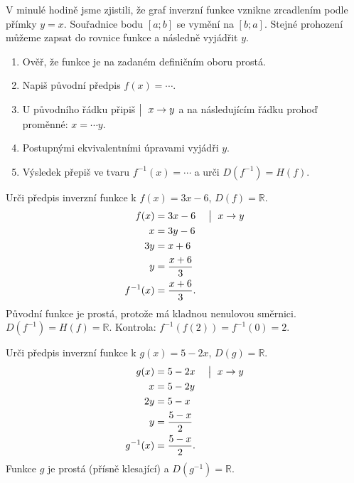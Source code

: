\documentclass[11pt,a4paper]{article}
\begin{document}

V minulé hodině jsme zjistili, že graf inverzní funkce vznikne zrcadlením podle přímky $y=x$. Souřadnice bodu $[a;b]$ se vymění na $[b;a]$. Stejné prohození můžeme zapsat do rovnice funkce a následně vyjádřit $y$.

\begin{enumerate}[label=\arabic*.]
\item Ověř, že funkce je na zadaném definičním oboru prostá.
\item Napiš původní předpis $f(x)=\cdots$.
\item U původního řádku připiš $\bigm|\ x\to y$ a na následujícím řádku prohoď proměnné: $x=\cdots y$.
\item Postupnými ekvivalentními úpravami vyjádři $y$.
\item Výsledek přepiš ve tvaru $f^{-1}(x)=\cdots$ a urči $D(f^{-1})=H(f)$.
\end{enumerate}

\begin{prikladReseniBox}[title={Příklad 1}]
Urči předpis inverzní funkce k $f(x)=3x-6$, $D(f)=\mathbb R$.
\tcblower
\[
\begin{aligned}
f(x)&=3x-6 &&\bigm|\ x\to y\\
x&=3y-6\\
3y&=x+6\\
y&=\frac{x+6}{3}\\
f^{-1}(x)&=\frac{x+6}{3}.
\end{aligned}
\]
Původní funkce je prostá, protože má kladnou nenulovou směrnici. $D(f^{-1})=H(f)=\mathbb R$. Kontrola: $f^{-1}(f(2))=f^{-1}(0)=2$.
\end{prikladReseniBox}

\begin{prikladReseniBox}[title={Příklad 2}]
Urči předpis inverzní funkce k $g(x)=5-2x$, $D(g)=\mathbb R$.
\tcblower
\[
\begin{aligned}
g(x)&=5-2x &&\bigm|\ x\to y\\
x&=5-2y\\
2y&=5-x\\
y&=\frac{5-x}{2}\\
g^{-1}(x)&=\frac{5-x}{2}.
\end{aligned}
\]
Funkce $g$ je prostá (přísně klesající) a $D(g^{-1})=\mathbb R$.
\end{prikladReseniBox}
\end{document}
